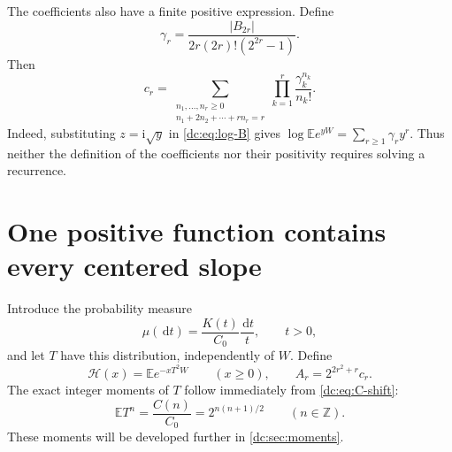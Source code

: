\documentclass[11pt,a4paper,oneside,openany]{book}
\numberwithin{equation}{chapter}
\theoremstyle{definition}
\theoremstyle{remark}
\newcommand{\Z}{\mathbb Z}
\newcommand{\E}{\mathbb E}
\newcommand{\dd}{\,\mathrm d}
\newcommand{\ii}{\mathrm i}
\newcommand{\abs}[1]{\left\lvert #1\right\rvert}
\newcommand{\calH}{\mathcal H}
\begin{document}
The coefficients also have a finite positive expression. Define
\begin{equation}
 \gamma_r=\frac{\abs{B_{2r}}}{2r(2r)!(2^{2r}-1)}.
 \label{dc:eq:gamma-positive}
\end{equation}
Then
\begin{equation}
 \boxed{\displaystyle
 c_r=\sum_{\substack{n_1,\ldots,n_r\ge0\\
                    n_1+2n_2+\cdots+rn_r=r}}
           \prod_{k=1}^r\frac{\gamma_k^{n_k}}{n_k!}.}
 \label{dc:eq:c-finite}
\end{equation}
Indeed, substituting $z=\ii\sqrt y$ in \cref{dc:eq:log-B} gives
$\log\E e^{yW}=\sum_{r\ge1}\gamma_ry^r$.
Thus neither the definition of the coefficients nor their positivity
requires solving a recurrence.

\section{One positive function contains every centered slope}
Introduce the probability measure
\begin{equation}
 \mu(\dd t)=\frac{K(t)}{C_0}\frac{\dd t}{t},\qquad t>0,
 \label{dc:eq:mu}
\end{equation}
and let $T$ have this distribution, independently of $W$.
Define
\begin{equation}
 \calH(x)=\E e^{-xT^2W}\qquad(x\ge0),
 \qquad A_r=2^{2r^2+r}c_r.
 \label{dc:eq:calH}
\end{equation}
The exact integer moments of $T$ follow immediately from
\cref{dc:eq:C-shift}:
\begin{equation}
 \E T^n=\frac{C(n)}{C_0}=2^{n(n+1)/2}
 \qquad(n\in\Z).
 \label{dc:eq:T-moments}
\end{equation}
These moments will be developed further in \cref{dc:sec:moments}.
\end{document}
